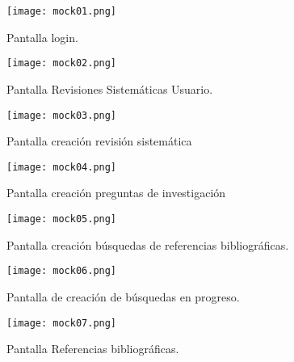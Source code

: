 \begin{figure}[!hp]
	\begin{center} 
		\texttt{[image: mock01.png]}
		\caption{Pantalla login.}
		\label{fig:mock01}
	\end{center}
\end{figure}

\begin{figure}[!hp]
	\begin{center} 
		\texttt{[image: mock02.png]}
		\caption{Pantalla Revisiones Sistemáticas Usuario.}
		\label{fig:mock02}
	\end{center}
\end{figure}

\begin{figure}[!hp]
	\begin{center} 
		\texttt{[image: mock03.png]}
		\caption{Pantalla creación revisión sistemática}
		\label{fig:mock03}
	\end{center}
\end{figure}

\begin{figure}[!hp]
	\begin{center} 
		\texttt{[image: mock04.png]}
		\caption{Pantalla creación preguntas de investigación}
		\label{fig:mock04}
	\end{center}
\end{figure}

\begin{figure}[!hp]
	\begin{center} 
		\texttt{[image: mock05.png]}
		\caption{Pantalla creación búsquedas de referencias bibliográficas.}
		\label{fig:mock05}
	\end{center}
\end{figure}

\begin{figure}[!hp]
	\begin{center} 
		\texttt{[image: mock06.png]}
		\caption{Pantalla de creación de búsquedas en progreso.}
		\label{fig:mock06}
	\end{center}
\end{figure}

\begin{figure}[!hp]
	\begin{center} 
		\texttt{[image: mock07.png]}
		\caption{Pantalla Referencias bibliográficas.}
		\label{fig:mock07}
	\end{center}
\end{figure}

